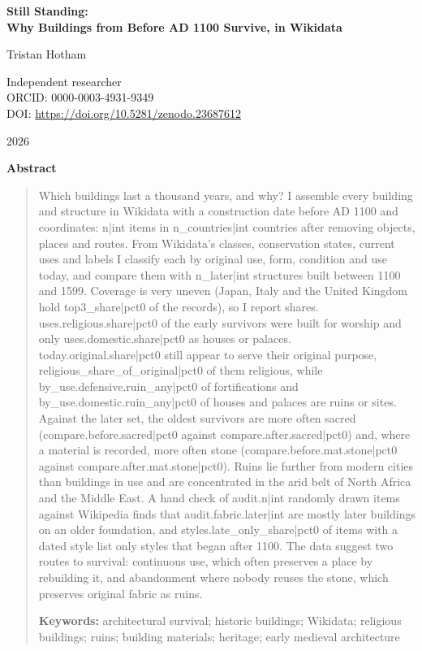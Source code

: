 \documentclass[11pt,a4paper]{article}
\begin{document}
\begin{center}
{\LARGE\bfseries Still Standing:\\[0.2em] Why Buildings from Before AD 1100 Survive, in Wikidata\par}
\vspace{1.4em}
{\large Tristan Hotham\par}
\vspace{0.3em}
{\small Independent researcher\\
ORCID: 0000-0003-4931-9349\\
DOI: \href{https://doi.org/10.5281/zenodo.23687612}{https://doi.org/10.5281/zenodo.23687612}\par}
\vspace{1em}
{\small 2026\par}
\end{center}

\vspace{0.5em}
\begin{center}\textbf{Abstract}\end{center}
\begin{quote}\small
Which buildings last a thousand years, and why? I assemble every building and structure in Wikidata with a construction date before AD 1100 and coordinates: {{n|int}} items in {{n_countries|int}} countries after removing objects, places and routes. From Wikidata's classes, conservation states, current uses and labels I classify each by original use, form, condition and use today, and compare them with {{n_later|int}} structures built between 1100 and 1599. Coverage is very uneven (Japan, Italy and the United Kingdom hold {{top3_share|pct0}} of the records), so I report shares. {{uses.religious.share|pct0}} of the early survivors were built for worship and only {{uses.domestic.share|pct0}} as houses or palaces. {{today.original.share|pct0}} still appear to serve their original purpose, {{religious_share_of_original|pct0}} of them religious, while {{by_use.defensive.ruin_any|pct0}} of fortifications and {{by_use.domestic.ruin_any|pct0}} of houses and palaces are ruins or sites. Against the later set, the oldest survivors are more often sacred ({{compare.before.sacred|pct0}} against {{compare.after.sacred|pct0}}) and, where a material is recorded, more often stone ({{compare.before.mat.stone|pct0}} against {{compare.after.mat.stone|pct0}}). Ruins lie further from modern cities than buildings in use and are concentrated in the arid belt of North Africa and the Middle East. A hand check of {{audit.n|int}} randomly drawn items against Wikipedia finds that {{audit.fabric.later|int}} are mostly later buildings on an older foundation, and {{styles.late_only_share|pct0}} of items with a dated style list only styles that began after 1100. The data suggest two routes to survival: continuous use, which often preserves a place by rebuilding it, and abandonment where nobody reuses the stone, which preserves original fabric as ruins.

\medskip
\textbf{Keywords:} architectural survival; historic buildings; Wikidata; religious buildings; ruins; building materials; heritage; early medieval architecture
\end{quote}
\end{document}
